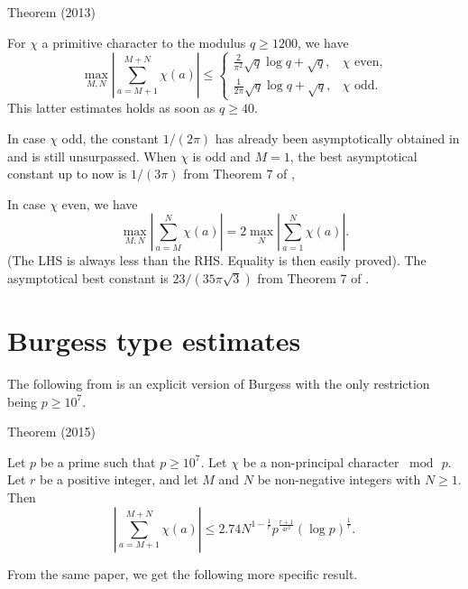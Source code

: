 \begin{thm}{Theorem (2013)}

  For $\chi$ a primitive character to the modulus $q \ge 1200$, we have
$$
\max_{M,N}\left|\sum_{a=M+1}^{M+N}\chi(a)\right|
\le
\begin{cases}
\frac{2}{\pi^2}\sqrt{q}\log q+\sqrt{q},&
  \text{$\chi$ even,}\\
\frac{1}{2\pi}\sqrt{q}\log q+\sqrt{q},&
  \text{$\chi$ odd}.
\end{cases}
$$
This latter estimates holds as soon as $q\ge40$.
\end{thm}


In case $\chi$ odd, the constant $1/(2\pi)$ has already
been asymptotically obtained in
\cite{Landau*18-3} and is still
unsurpassed. When $\chi$ is odd and $M=1$, the best asymptotical constant up to now is
$1/(3\pi)$ from Theorem 7 of
\cite{Granville-Soundararajan*07},

In case $\chi$ even, we have
$$
\max_{M,N}\left|\sum_{a=M}^N\chi(a)\right|
=2\max_{N}\left|\sum_{a=1}^N\chi(a)\right|.
$$
(The LHS is always less than the RHS. Equality is then easily proved).
The asymptotical best constant
is $23/(35\pi\sqrt{3})$ from Theorem 7 of
\cite{Granville-Soundararajan*07}.

\section{Burgess type estimates
}


The following from 
\cite{Trevino*15-2}
is an explicit version of Burgess with the only restriction being
$p\ge 10^7$.

\begin{thm}{Theorem (2015)}

Let $p$ be a prime such that $p \ge 10^7$. Let $\chi$ be a non-principal character $\bmod{\,p}$. Let $r$ be a positive integer, and let $M$ and $N$ be non-negative integers with $N\ge 1$. Then
$$
\left|\sum_{a=M+1}^{M+N}\chi(a)\right|
\le 2.74 N^{1-\frac{1}{r}}
p^{\frac{r+1}{4r^2}}(\log{p})^{\frac{1}{r}}.
$$
\end{thm}


  From the same paper, we get the following more specific result.

